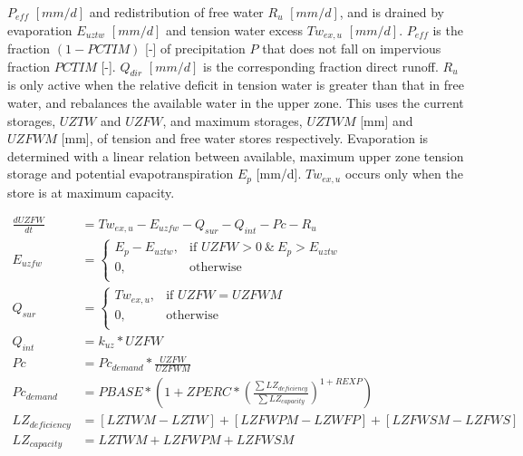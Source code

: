 \noindent$P_{eff}$ $[mm/d]$ and redistribution of free water $R_u$  $[mm/d]$, and is drained by evaporation $E_{uztw}$ $[mm/d]$ and tension water excess $Tw_{ex,u}$ $[mm/d]$.
$P_{eff}$ is the fraction $(1-PCTIM)$ [-] of precipitation $P$ that does not fall on impervious fraction $PCTIM$ [-].
$Q_{dir}$ $[mm/d]$ is the corresponding fraction direct runoff.
$R_u$ is only active when the relative deficit in tension water is greater than that in free water, and rebalances the available water in the upper zone. This uses the current storages, $UZTW$ and $UZFW$, and maximum storages, $UZTWM$ [mm] and $UZFWM$ [mm], of tension and free water stores respectively.
Evaporation is determined with a linear relation between available, maximum upper zone tension storage and potential evapotranspiration $E_p$ [mm/d].
$Tw_{ex,u}$ occurs only when the store is at maximum capacity.



\begin{align}
	\frac{dUZFW}{dt} &= Tw_{ex,u} - E_{uzfw} - Q_{sur} - Q_{int} - Pc - R_u \\
	E_{uzfw} &= \begin{cases}
		E_p-E_{uztw}, &\text{if } UZFW > 0 ~\&~ E_p>E_{uztw} \\
		0, & \text{otherwise} \\
	\end{cases}\\
	Q_{sur} &= \begin{cases}
		Tw_{ex,u}, &\text{if } UZFW = UZFWM \\
		0, & \text{otherwise} \\
	\end{cases}\\
	Q_{int} &= k_{uz} * UZFW\\
	Pc &= Pc_{demand} *\frac{UZFW}{UZFWM}\\
	Pc_{demand} &= PBASE*\left(1+ZPERC*\left(\frac{\sum{LZ_{deficiency}}}{\sum{LZ_{capacity}}}\right)^{1+REXP}\right)\\
	LZ_{deficiency} &= [LZTWM-LZTW]+[LZFWPM-LZWFP]+[LZFWSM-LZFWS]\\
	LZ_{capacity} &= LZTWM+LZFWPM+LZFWSM
\end{align}

